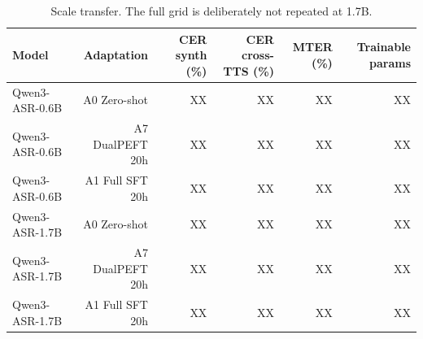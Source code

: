 \begin{table}[t]
\centering
\caption{Scale transfer. The full grid is deliberately not repeated at 1.7B.}
\label{tab:table6_model_scale}
\begin{tabular}{lrrrrr}
\toprule
Model & Adaptation & CER synth (\%) & CER cross-TTS (\%) & MTER (\%) & Trainable params \\
\midrule
Qwen3-ASR-0.6B & A0 Zero-shot & XX & XX & XX & XX \\
Qwen3-ASR-0.6B & A7 DualPEFT 20h & XX & XX & XX & XX \\
Qwen3-ASR-0.6B & A1 Full SFT 20h & XX & XX & XX & XX \\
Qwen3-ASR-1.7B & A0 Zero-shot & XX & XX & XX & XX \\
Qwen3-ASR-1.7B & A7 DualPEFT 20h & XX & XX & XX & XX \\
Qwen3-ASR-1.7B & A1 Full SFT 20h & XX & XX & XX & XX \\
\bottomrule
\end{tabular}
\end{table}
